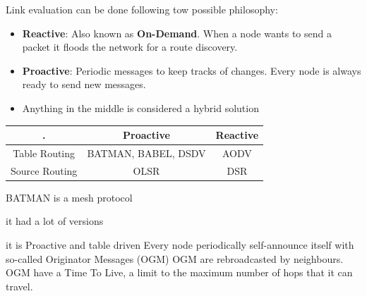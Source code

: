 \documentclass{article}
\begin{document}
Link evaluation can be done following tow possible philosophy:
\begin{itemize}
    \item \textbf{Reactive}:  Also known as \textbf{On-Demand}.
        When a node wants to send a packet it floods the network for a route discovery.
    \item \textbf{Proactive}: Periodic messages to keep tracks of changes.
        Every node is always ready to send new messages. 
    \item Anything in the middle is considered a hybrid solution
\end{itemize}

\begin{center}
\begin{tabular}{ c | c |  c }
 . & Proactive & Reactive \\ 
 \hline
 Table Routing & BATMAN, BABEL, DSDV & AODV \\  
  \hline
 Source Routing & OLSR & DSR \\
\end{tabular}
\end{center}


BATMAN is a mesh protocol

it had a lot of versions

it is Proactive and table driven
Every node periodically self-announce itself with so-called Originator Messages (OGM)
OGM are rebroadcasted by neighbours.
OGM have a Time To Live, a limit to the maximum number of hops that it can travel. 
\end{document}
